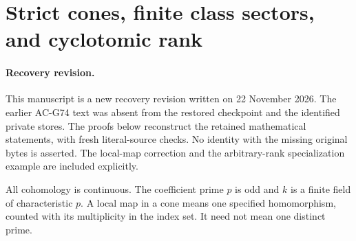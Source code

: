 \section{Strict cones, finite class sectors, and cyclotomic rank}
\label{sec:cubic-frame-mu-criterion}

\paragraph{Recovery revision.}
This manuscript is a new recovery revision written on 22 November 2026.
The earlier AC-G74 text was absent from the restored checkpoint and the
identified private stores.  The proofs below reconstruct the retained
mathematical statements, with fresh literal-source checks.  No identity
with the missing original bytes is asserted.  The local-map correction
and the arbitrary-rank specialization example are included explicitly.

All cohomology is continuous.  The coefficient prime \(p\) is odd and
\(k\) is a finite field of characteristic \(p\).  A local map in a cone
means one specified homomorphism, counted with its multiplicity in the
index set.  It need not mean one distinct prime.

